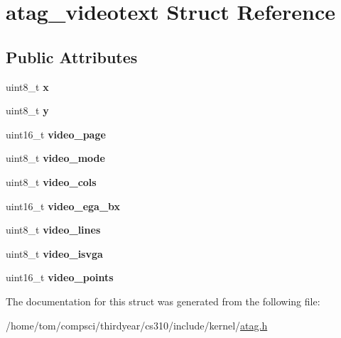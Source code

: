 \hypertarget{structatag__videotext}{}\section{atag\+\_\+videotext Struct Reference}
\label{structatag__videotext}
\subsection*{Public Attributes}
\begin{DoxyCompactItemize}
\item 
\mbox{\label{structatag__videotext_a92df1440599ad395414eaea53b17928b}} 
uint8\+\_\+t {\bfseries x}
\item 
\mbox{\label{structatag__videotext_a87e511ba3f5fd2bf69f4be58fc842335}} 
uint8\+\_\+t {\bfseries y}
\item 
\mbox{\label{structatag__videotext_acc5cfc9ca8d56da6d15137ea1c73a9a9}} 
uint16\+\_\+t {\bfseries video\+\_\+page}
\item 
\mbox{\label{structatag__videotext_aca7dadbc26b89e1ca8c1f0ee32025c51}} 
uint8\+\_\+t {\bfseries video\+\_\+mode}
\item 
\mbox{\label{structatag__videotext_a890bd0771bb68dabf21587a83a19befc}} 
uint8\+\_\+t {\bfseries video\+\_\+cols}
\item 
\mbox{\label{structatag__videotext_a217f957b72a5bed0f8592b78c087f179}} 
uint16\+\_\+t {\bfseries video\+\_\+ega\+\_\+bx}
\item 
\mbox{\label{structatag__videotext_a06acd30e97c2bcda88cdcd7c4daad607}} 
uint8\+\_\+t {\bfseries video\+\_\+lines}
\item 
\mbox{\label{structatag__videotext_a9ef367ba41c3d27c0ddaf45037b99b7d}} 
uint8\+\_\+t {\bfseries video\+\_\+isvga}
\item 
\mbox{\label{structatag__videotext_adb1b14d0cb9ef42f18a5d92b2a419b47}} 
uint16\+\_\+t {\bfseries video\+\_\+points}
\end{DoxyCompactItemize}


The documentation for this struct was generated from the following file\+:\begin{DoxyCompactItemize}
\item 
/home/tom/compsci/thirdyear/cs310/include/kernel/\mbox{\hyperlink{atag_8h}{atag.\+h}}\end{DoxyCompactItemize}
